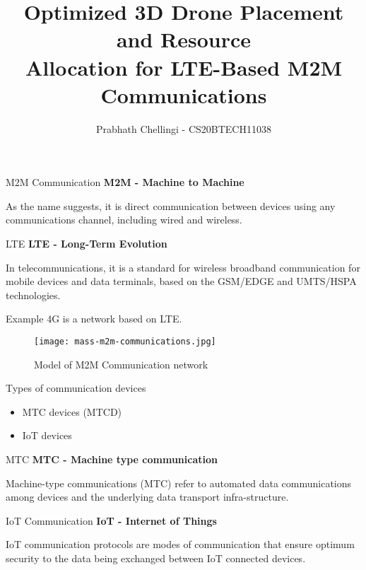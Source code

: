 \documentclass{beamer}
\title{Optimized 3D Drone Placement and Resource\\Allocation for LTE-Based M2M Communications}
\author{Prabhath Chellingi - CS20BTECH11038}
\date{}
\begin{document}
\begin{frame}
\titlepage
\end{frame}

\begin{frame}


\begin{block}{M2M Communication}
\textbf{M2M - Machine to Machine}

As the name suggests, it is direct communication between devices using any communications channel, including wired and wireless.
\end{block}
\begin{block}{LTE}
\textbf{LTE - Long-Term Evolution}

In telecommunications, it is a standard for wireless broadband communication for mobile devices and data terminals, based on the GSM/EDGE and UMTS/HSPA technologies.
\end{block}
\begin{block}{Example}
4G is a network based on LTE.
\end{block}
\end{frame}
\begin{frame}{}
    \begin{figure}[h!]
    \centering
    \texttt{[image: mass-m2m-communications.jpg]}
    \caption{Model of M2M Communication network}
    \label{fig:M2M}
\end{figure}
\end{frame}
\begin{frame}{}
\begin{block}{Types of communication devices}
\begin{itemize}
    \item MTC devices (MTCD)
    \item IoT devices
\end{itemize}
\end{block}
\begin{block}{MTC}
\textbf{MTC - Machine type communication}

Machine-type communications (MTC) refer to automated data communications among devices and the underlying data transport infra-structure.
\end{block}
\begin{block}{IoT Communication}
\textbf{IoT - Internet of Things}

IoT communication protocols are modes of communication that ensure optimum security to the data being exchanged between IoT connected devices.
\end{block}
\end{frame}
\end{document}
